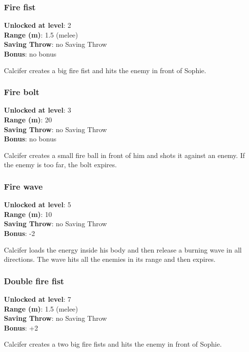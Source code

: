 \subsubsection{Fire fist}
\textbf{Unlocked at level}: 2 \\
\textbf{Range (m)}: 1.5 (melee) \\
\textbf{Saving Throw}: no Saving Throw \\
\textbf{Bonus}: no bonus

Calcifer creates a big fire fist and hits the enemy in front of Sophie.

\subsubsection{Fire bolt}
\textbf{Unlocked at level}: 3 \\
\textbf{Range (m)}: 20 \\
\textbf{Saving Throw}: no Saving Throw \\
\textbf{Bonus}: no bonus

Calcifer creates a small fire ball in front of him and shots it against an enemy. If the enemy is too far, the bolt expires.

\subsubsection{Fire wave}
\textbf{Unlocked at level}: 5 \\
\textbf{Range (m)}: 10 \\
\textbf{Saving Throw}: no Saving Throw \\
\textbf{Bonus}: -2

Calcifer loads the energy inside his body and then release a burning wave in all directions. The wave hits all the enemies in its range and then expires.

\subsubsection{Double fire fist}
\textbf{Unlocked at level}: 7 \\
\textbf{Range (m)}: 1.5 (melee) \\
\textbf{Saving Throw}: no Saving Throw \\
\textbf{Bonus}: +2

Calcifer creates a two big fire fists and hits the enemy in front of Sophie.

